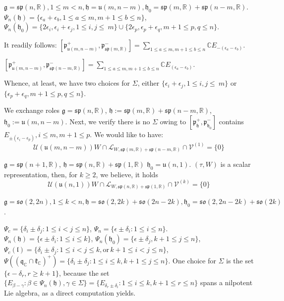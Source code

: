 \documentclass[12pt]{amsart}
\theoremstyle{definition}
\theoremstyle{remark}
\newcommand{\g}{\mathfrak{g}}
\newcommand{\h}{\mathfrak{h}}
\renewcommand{\k}{{\mathfrak k}}
\renewcommand{\l}{\mathfrak l}
\newcommand{\p}{\mathfrak p}
\newcommand{\q}{\mathfrak q}
\newcommand{\C}{{\mathbb C}}
\newcommand{\R}{{\mathbb R}}
\numberwithin{equation}{section}
\begin{document}
\smallskip



$\g=\mathfrak{sp}(n, \R), 1\leq m <n,  \h=\mathfrak u(m,n-m), \h_0=\mathfrak{sp}(m, \R)+\mathfrak{sp}(n-m, \R) $. $\Psi_n(\h)=\{ \epsilon_a +\epsilon_b, 1\leq a \leq m, m+1 \leq b \leq n \}$, $\Psi_n(\h_0)=\{ 2\epsilon_i, \epsilon_i +\epsilon_j, 1\leq i,j \leq \ m  \}\cup \{ 2\epsilon_p, \epsilon_p +\epsilon_q, m+1\leq p,q \leq  n  \} $.

It readily follows: $[\p_{\mathfrak u(m,n-m)}^+, \p_{\mathfrak{sp}(m, \R) }^-]=\sum_{ 1\leq a\leq m, m+1\leq b \leq n} \C E_{-(\epsilon_a -\epsilon_b)}$.

 $[\p_{\mathfrak u(m,n-m)}^+, \p_{\mathfrak{sp}(n-m, \R) }^-]=\sum_{ 1\leq a\leq m, m+1\leq b \leq n} \C E_{(\epsilon_a -\epsilon_b)}$.


Whence, at least, we have two choices for $\Sigma$, either $\{ \epsilon_i +\epsilon_j, 1\leq i,j \leq \ m  \}$ or $\{ \epsilon_p +\epsilon_q, m+1\leq p,q \leq  n  \}$.


  We exchange roles $\g=\mathfrak{sp}(n, \R)$, $\h:=\mathfrak{sp}(m, \R)+\mathfrak{sp}(n-m, \R) $, $\h_0:=\mathfrak u(m,n-m)$.
Next, we verify there is no $\Sigma$ owing to $[\p_\h^+, \p_{\h_0}^-]$ contains $E_{\pm(\epsilon_i - \epsilon_p)}, i\leq m, m+1 \leq p$.
 We would like to have: \begin{equation} \mathcal U( \mathfrak u(m,n-m))W \cap \mathcal L_{W,\mathfrak{sp}(m, \R)+\mathfrak{sp}(n-m, \R)} \cap \mathcal V^{(1)}=\{0\} \end{equation}


  $\g=\mathfrak{sp}(n+1,\R)$, $\h=\mathfrak{sp}(n, \R)+\mathfrak{sp}(1, \R)$ $\h_0=\mathfrak u(n,1)$. $(\tau, W)$ is a scalar representation, then, for $k\geq 2$, we believe,  it holds  \begin{equation}  \mathcal U( \mathfrak u(n,1))W \cap \mathcal L_{W,\mathfrak{sp}(n, \R)+\mathfrak{sp}(1, \R)} \cap \mathcal V^{(k)} =\{0\} \end{equation}


$\g=\mathfrak{so}(2,2n), 1 \leq k<n, \h=\mathfrak{so}(2,2k)+\mathfrak{so}(2n-2k), \h_0=\mathfrak{so}(2,2n-2k)+\mathfrak{so}(2k)$.

$\Psi_c=\{\delta_i \pm \delta_j :  1 \leq i<j\leq n\}$, $\Psi_n=\{\epsilon \pm \delta_i :  1 \leq i \leq n \}$. $\Psi_n(\h)=\{ \epsilon \pm \delta_i  :  1 \leq i\leq k \}$, $\Psi_n(\h_0)=\{ \epsilon \pm \delta_j, k+1 \leq j \leq n  \}$, $\Psi_c(\l)=\{\delta_i \pm \delta_j :  1 \leq i<j\leq k, \text{or}\, k+1 \leq i<j\leq n  \}$, $\Psi ((\q_\C \cap \k_\C)^+ )= \{\delta_i \pm \delta_j :  1 \leq i \leq k, k+1 \leq j \leq n \}$. One  choice  for $\Sigma$ is the set
$  \{ \epsilon -\delta_r, r\geq k+1 \}$,  because the set  $\{E_{\beta -\gamma} : \beta \in \Psi_n(\h), \gamma \in \Sigma\}= \{E_{\delta_r \pm \delta_i} : 1\leq i \leq k, k+1 \leq r \leq n \}$ spans a  nilpotent Lie algebra, as a direct computation yields.
\end{document}
